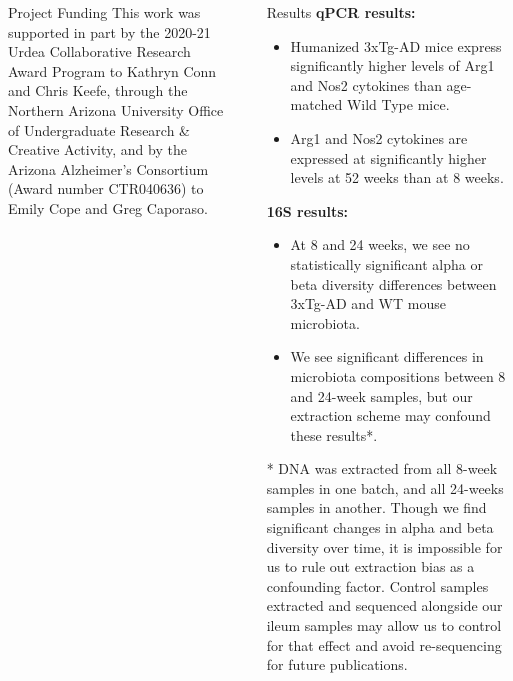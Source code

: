 \documentclass[final]{beamer}
\newlength{\sepwidth}
\newlength{\colwidth}
\newcommand{\separatorcolumn}{\begin{column}{\sepwidth}\end{column}}
\begin{document}
\begin{frame}[t]
\begin{columns}[t]
\begin{column}{\colwidth}
  \begin{block}{Project Funding}
    This work was supported in part by the 2020-21 Urdea Collaborative
    Research Award Program to Kathryn Conn and Chris Keefe, through the
    Northern Arizona University Office of Undergraduate Research \& Creative
    Activity, and by the Arizona Alzheimer’s Consortium (Award number
    CTR040636) to Emily Cope and Greg Caporaso.
  \end{block}

\end{column}

\separatorcolumn

\begin{column}{\colwidth}
    \begin{block}{Results}
      \textbf{qPCR results:}
      \begin{itemize}
        \item Humanized 3xTg-AD mice express significantly higher levels of Arg1 and Nos2 cytokines than age-matched Wild Type mice.
        \item Arg1 and Nos2 cytokines are expressed at significantly higher levels at 52 weeks than at 8 weeks.
      \end{itemize}

      \textbf{16S results:}
      \begin{itemize}
      \item At 8 and 24 weeks, we see no statistically significant alpha or beta diversity differences between 3xTg-AD and WT mouse microbiota.
      \item We see significant differences in microbiota compositions between 8 and 24-week samples, but our extraction scheme may confound these results*.
      \end{itemize}

    \begin{tcolorbox}
    [width=\textwidth, colframe=blue]
      * DNA was extracted from all 8-week samples in one batch, and all
      24-weeks samples in another. Though we find significant changes in
      alpha and beta diversity over time, it is impossible for us to rule out
      extraction bias as a confounding factor. Control samples extracted
      and sequenced alongside our ileum samples may allow us to control for 
      that effect and avoid re-sequencing for future publications. 
    \end{tcolorbox}


\end{block}
\end{column}
\end{columns}
\end{frame}
\end{document}
